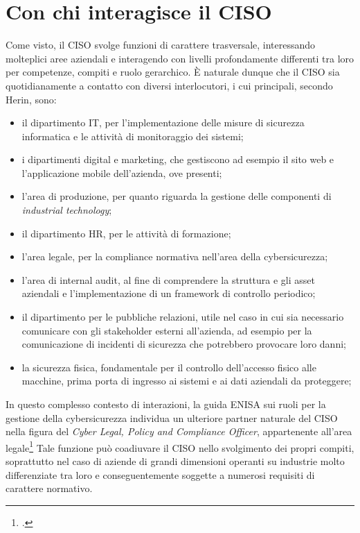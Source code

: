 \section{Con chi interagisce il CISO}
Come visto, il CISO svolge funzioni di carattere trasversale,
interessando molteplici aree aziendali e interagendo con livelli profondamente 
differenti tra loro per competenze, compiti e ruolo gerarchico.
È naturale dunque che il CISO sia quotidianamente a contatto con diversi interlocutori,
i cui principali, secondo Herin, sono:
\begin{itemize}
    \item il dipartimento IT, per l'implementazione delle misure di sicurezza informatica e
    le attività di monitoraggio dei sistemi;
    \item i dipartimenti digital e marketing, che gestiscono ad esempio il sito web e l'applicazione 
    mobile dell'azienda, ove presenti;
    \item l'area di produzione, per quanto riguarda la gestione delle componenti di \textit{industrial 
    technology};
    \item il dipartimento HR, per le attività di formazione;
    \item l'area legale, per la compliance normativa nell'area della cybersicurezza;
    \item l'area di internal audit, al fine di comprendere la struttura e gli asset aziendali e
    l'implementazione di un framework di controllo periodico;
    \item il dipartimento per le pubbliche relazioni, utile nel caso in cui sia 
    necessario comunicare con gli stakeholder esterni all'azienda, ad esempio per la
    comunicazione di incidenti di sicurezza che potrebbero provocare loro danni;
    \item la sicurezza fisica, fondamentale per il controllo dell'accesso fisico alle
    macchine, prima porta di ingresso ai sistemi e ai dati aziendali da proteggere;
\end{itemize}

In questo complesso contesto di interazioni, la guida ENISA sui ruoli per la gestione della cybersicurezza
individua un ulteriore partner naturale del CISO
nella figura del \textit{Cyber Legal, Policy and Compliance Officer}, appartenente all'area legale\footcite[pp.~24--25]{enisa-cybersecurity-roles}
Tale funzione può coadiuvare il CISO nello svolgimento dei propri compiti, soprattutto nel caso di aziende di 
grandi dimensioni operanti su industrie molto differenziate tra loro e conseguentemente soggette a numerosi
requisiti di carattere normativo.


